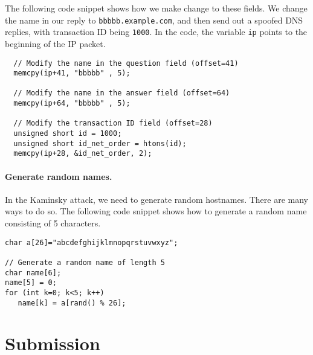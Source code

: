 The following code snippet shows how we make change to these fields. We change
the name in our reply to \texttt{bbbbb.example.com}, and then send out a
spoofed DNS replies, with transaction ID being \texttt{1000}.
In the code, the variable \texttt{ip} points to the beginning of the IP packet.  

\begin{lstlisting}
  // Modify the name in the question field (offset=41)
  memcpy(ip+41, "bbbbb" , 5);

  // Modify the name in the answer field (offset=64)
  memcpy(ip+64, "bbbbb" , 5);

  // Modify the transaction ID field (offset=28)
  unsigned short id = 1000;
  unsigned short id_net_order = htons(id);
  memcpy(ip+28, &id_net_order, 2);
\end{lstlisting}



\paragraph{Generate random names.} In the Kaminsky attack, we need to 
generate random hostnames. There are many ways to do so. The following 
code snippet shows how to generate a random name consisting of 
5 characters. 

\begin{lstlisting}
char a[26]="abcdefghijklmnopqrstuvwxyz";

// Generate a random name of length 5
char name[6];
name[5] = 0;
for (int k=0; k<5; k++)  
   name[k] = a[rand() % 26];
\end{lstlisting}
 



\section{Submission}





\thispagestyle{empty}

\def\baselinestretch{1}








